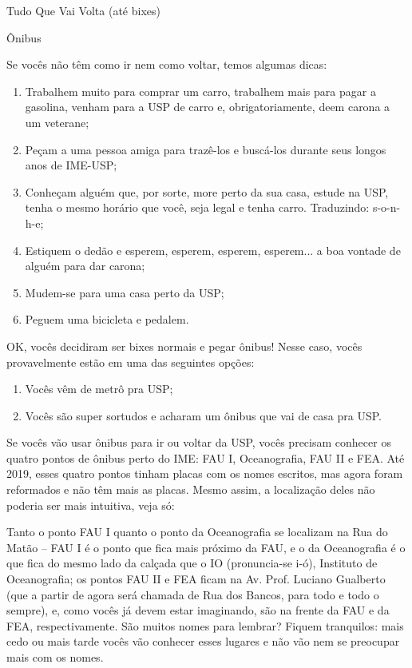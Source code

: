 \begin{secao}{Tudo Que Vai Volta (até bixes)}

\begin{subsecao}{Ônibus}

Se vocês não têm como ir nem como voltar, temos algumas dicas:

\begin{enumerate}
\vspace{-15pt}
  \item Trabalhem muito para comprar um carro, trabalhem mais para pagar a
  gasolina, venham para a USP de carro e, obrigatoriamente, deem carona a um
  veterane;

  \item Peçam a uma pessoa amiga para trazê-los e buscá-los durante seus
  longos anos de IME-USP;

  \item Conheçam alguém que, por sorte, more perto da sua casa, estude na USP,
  tenha o mesmo horário que você, seja legal e tenha carro.
  Traduzindo: s-o-n-h-e;

  \item Estiquem o dedão e esperem, esperem, esperem, esperem... a boa vontade
  de alguém para dar carona;

  \item Mudem-se para uma casa perto da USP;

  \item Peguem uma bicicleta e pedalem.

\end{enumerate}
\vspace{-15pt}
OK, vocês decidiram ser bixes normais e pegar ônibus! Nesse caso, vocês
provavelmente estão em uma das seguintes opções:
\vspace{-15pt}
\begin{enumerate}
  \item Vocês vêm de metrô pra USP;
  \item Vocês são super sortudos e acharam um ônibus que vai de casa pra USP.
\end{enumerate}
\vspace{-15pt}
Se vocês vão usar ônibus para ir ou voltar da USP, vocês precisam conhecer
os quatro pontos de ônibus perto do IME: FAU I, Oceanografia, FAU II e FEA.
Até 2019, esses quatro pontos tinham placas com os nomes escritos, mas
agora foram reformados e não têm mais as placas. Mesmo assim, a localização
deles não poderia ser mais intuitiva, veja só:

Tanto o ponto FAU I quanto o ponto da Oceanografia se localizam na Rua do
Matão -- FAU I é o ponto que fica mais próximo da FAU, e o da Oceanografia é o
que fica do mesmo lado da calçada que o IO (pronuncia-se i-ó), Instituto de
Oceanografia; os pontos FAU II e FEA ficam na Av. Prof. Luciano Gualberto (que a
partir de agora será chamada de Rua dos Bancos, para todo e todo o sempre),
e, como vocês já devem estar imaginando, são na frente da FAU e da FEA,
respectivamente. São muitos nomes para lembrar? Fiquem tranquilos: mais
cedo ou mais tarde vocês vão conhecer esses lugares e não vão nem se preocupar
mais com os nomes.


\end{subsecao}
\end{secao}
